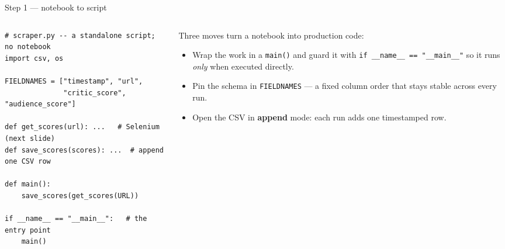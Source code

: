 \documentclass[9pt,aspectratio=169]{beamer}
\begin{document}
\begin{frame}[fragile]{Step 1 --- notebook to script}
    \begin{columns}[T]
        \begin{column}{0.56\textwidth}
\begin{lstlisting}
# scraper.py -- a standalone script; no notebook
import csv, os

FIELDNAMES = ["timestamp", "url",
              "critic_score", "audience_score"]

def get_scores(url): ...   # Selenium (next slide)
def save_scores(scores): ...  # append one CSV row

def main():
    save_scores(get_scores(URL))

if __name__ == "__main__":   # the entry point
    main()
\end{lstlisting}
        \end{column}
        \begin{column}{0.42\textwidth}
            Three moves turn a notebook into production code:
            \begin{itemize}\small
                \item Wrap the work in a \texttt{main()} and guard it with \texttt{if \_\_name\_\_ == "\_\_main\_\_"} so it runs \textit{only} when executed directly.
                \item Pin the schema in \texttt{FIELDNAMES} --- a fixed column order that stays stable across every run.
                \item Open the CSV in \textbf{append} mode: each run adds one timestamped row.
            \end{itemize}
        \end{column}
    \end{columns}
\end{frame}
\end{document}
